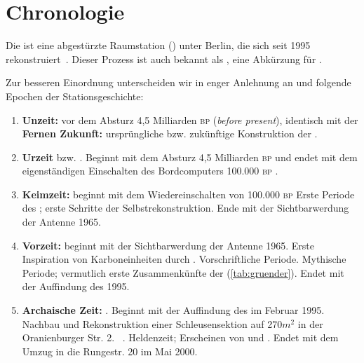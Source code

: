\section{Chronologie}%

    Die  ist eine abgestürzte Raumstation () unter Berlin, die sich seit 1995 rekonstruiert~\cite{cbasebook}. Dieser Prozess ist auch bekannt als ,  eine Abkürzung für . 
    
    Zur besseren Einordnung unterscheiden wir in enger Anlehnung an \cite{cbasepressemap} und \cite{cbasebook} folgende Epochen der Stationsgeschichte:
    \begin{enumerate}
        \item \textbf{Unzeit:} vor dem Absturz 4,5 Milliarden \textsc{bp}  (\emph{before present}), identisch mit der \textbf{Fernen Zukunft:} ursprüngliche bzw. zukünftige Konstruktion der .
        
        \item \textbf{Urzeit} bzw. . Beginnt mit dem  Absturz 4,5 Milliarden \textsc{bp}  und endet mit dem eigenständigen Einschalten des Bordcomputers  \cite{cbasepressemap} 100.000 \textsc{bp} .
        
        \item \textbf{Keimzeit:} beginnt mit dem Wiedereinschalten von  100.000 \textsc{bp}  Erste Periode des ; erste Schritte der Selbstrekonstruktion. Ende mit der Sichtbarwerdung der Antenne 1965.
        
        \item \textbf{Vorzeit:} beginnt mit der Sichtbarwerdung der Antenne 1965. Erste Inspiration von Karboneinheiten durch . Vorschriftliche Periode. Mythische Periode; vermutlich erste Zusammenkünfte der  (\cref{tab:gruender}). Endet mit der Auffindung des  1995.
        
        \item \textbf{Archaische Zeit:} . Beginnt mit der Auffindung des  im Februar 1995.  Nachbau und Rekonstruktion einer Schleusensektion auf 270$m^2$ in der Oranienburger Str. 2. \cite{cbasepressemap}~\cite{cbasebook}. Heldenzeit; Erscheinen von \cite{cbaselogbuchpre} und \cite{cbaselogbuchnow}. Endet mit dem Umzug in die Rungestr. 20 im Mai 2000.
        

\end{enumerate}
